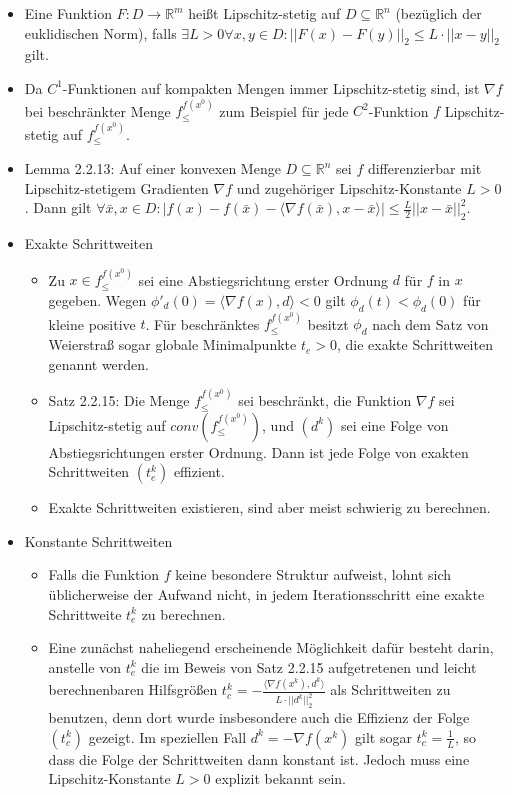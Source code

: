 \documentclass[paper=a4, fontsize=11pt]{scrartcl} %
\numberwithin{equation}{section} %
\numberwithin{figure}{section} %
\numberwithin{table}{section} %
\begin{document}
\begin{itemize}
\item Eine Funktion $F: D \rightarrow \mathbb{R}^m$ heißt Lipschitz-stetig auf $D \subseteq \mathbb{R}^n$ (bezüglich der euklidischen Norm), falls $\exists L > 0 \forall x,y \in D: ||F(x) - F(y)||_2 \le L \cdot ||x-y||_2$ gilt.
\item Da $C^1$-Funktionen auf kompakten Mengen immer Lipschitz-stetig sind, ist $\nabla f$ bei beschränkter Menge $f^{f(x^0)}_\le$ zum Beispiel für jede $C^2$-Funktion $f$ Lipschitz-stetig auf $f^{f(x^0)}_\le$.
\item Lemma 2.2.13: Auf einer konvexen Menge $D \subseteq \mathbb{R}^n$ sei $f$ differenzierbar mit Lipschitz-stetigem Gradienten $\nabla f$ und zugehöriger Lipschitz-Konstante $L > 0$. Dann gilt $\forall \bar{x},x \in D: |f(x) - f(\bar{x}) - \langle \nabla f(\bar{x}),x-\bar{x}\rangle | \le \frac{L}{2} ||x-\bar{x}||^2_2$.
\item Exakte Schrittweiten
\begin{itemize}
\item Zu $x \in f^{f(x^0)}_\le$ sei eine Abstiegsrichtung erster Ordnung $d$ für $f$ in $x$ gegeben. Wegen $\phi'_d(0) = \langle \nabla f(x),d\rangle < 0$ gilt $\phi_d(t) < \phi_d(0)$ für kleine positive $t$. Für beschränktes $f^{f(x^0)}_\le$ besitzt $\phi_d$ nach dem Satz von Weierstraß sogar globale Minimalpunkte $t_e > 0$, die exakte Schrittweiten genannt werden.
\item Satz 2.2.15: Die Menge $f^{f(x^0)}_\le$ sei beschränkt, die Funktion $\nabla f$ sei Lipschitz-stetig auf $conv(f^{f(x^0)}_\le)$, und $(d^k)$ sei eine Folge von Abstiegsrichtungen erster Ordnung. Dann ist jede Folge von exakten Schrittweiten $(t^k_e)$ effizient.
\item Exakte Schrittweiten existieren, sind aber meist schwierig zu berechnen.
\end{itemize}
\item Konstante Schrittweiten
\begin{itemize}
\item Falls die Funktion $f$ keine besondere Struktur aufweist, lohnt sich üblicherweise der Aufwand nicht, in jedem Iterationsschritt eine exakte Schrittweite $t^k_e$ zu berechnen.
\item Eine zunächst naheliegend erscheinende Möglichkeit dafür besteht darin, anstelle von $t^k_e$ die im Beweis von Satz 2.2.15 aufgetretenen und leicht berechnenbaren Hilfsgrößen $t_c^k = - \frac{\langle \nabla f(x^k), d^k \rangle}{L \cdot ||d^k||_2^2}$ als Schrittweiten zu benutzen, denn dort wurde insbesondere auch die Effizienz der Folge $(t_c^k)$ gezeigt. Im speziellen Fall $d^k = - \nabla f(x^k)$ gilt sogar $t_c^k = \frac{1}{L}$, so dass die Folge der Schrittweiten dann konstant ist. Jedoch muss eine Lipschitz-Konstante $L > 0$ explizit bekannt sein.

\end{itemize}
\end{itemize}
\end{document}
